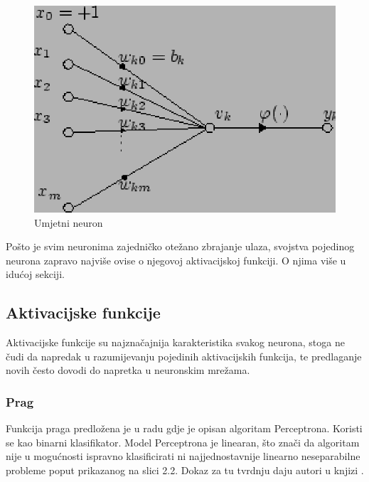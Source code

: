 \documentclass[times, utf8, diplomski]{fer}
\begin{document}
\begin{figure}[!htbp]
    \centering
    \includegraphics[scale=0.8]{Slike/Artificial_neuron}
    \caption{Umjetni neuron \cite{neuron}}
\end{figure}

Pošto je svim neuronima zajedničko otežano zbrajanje ulaza, svojstva pojedinog neurona zapravo najviše ovise o njegovoj aktivacijskoj funkciji. O njima više u idućoj sekciji.

\subsection{Aktivacijske funkcije}
Aktivacijske funkcije su najznačajnija karakteristika svakog neurona, stoga ne čudi da napredak u razumijevanju pojedinih aktivacijskih funkcija, te predlaganje novih često dovodi do napretka u neuronskim mrežama.

\subsubsection{Prag}
Funkcija praga predložena je u radu \cite{perceptron} gdje je opisan algoritam Perceptrona. Koristi se kao binarni klasifikator. Model Perceptrona je linearan, što znači da algoritam nije u mogućnosti ispravno klasificirati ni najjednostavnije linearno neseparabilne probleme poput prikazanog na slici 2.2. Dokaz za tu tvrdnju daju autori u knjizi \cite{minsky}.
\end{document}
